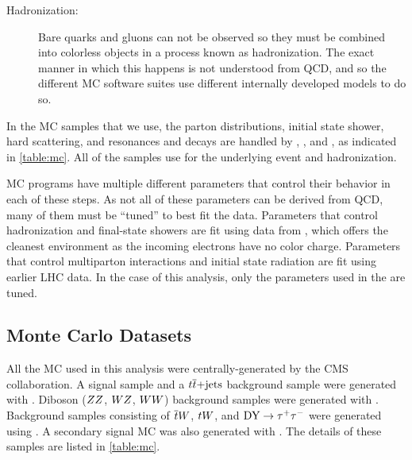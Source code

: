 \begin{description}
    \item[Hadronization:] Bare quarks and gluons can not be observed so they
        must be combined into colorless objects in a process known as
        hadronization. The exact manner in which this happens is not understood
        from QCD, and so the different MC software suites use different
        internally developed models to do so.


\end{description}

In the MC samples that we use, the parton distributions, initial state shower,
hard scattering, and resonances and decays are handled by \MADGRAPH
{} \cite{alwall2014}, \POWHEG
\cite{nason2004}\cite{alioli2010}\cite{re2011}, and \PYTHIAsix
{} \cite{sjostran2006}, as indicated in \cref{table:mc}.
All of the samples use \PYTHIAsix for the underlying event and hadronization.

MC programs have multiple different parameters that control their behavior in
each of these steps. As not all of these parameters can be derived from QCD,
many of them must be ``tuned'' to best fit the data. Parameters that control
hadronization and final-state showers are fit using data from \LEP, which
offers the cleanest environment as the incoming electrons have no color charge.
Parameters that control multiparton interactions and initial state radiation
are fit using earlier LHC data. In the case of this analysis, only the
parameters used in the \PYTHIAsix are tuned.

\subsection{Monte Carlo Datasets}
\label{ssec:monte_carlo}

All the MC used in this analysis were centrally-generated by the CMS
collaboration. A \DYtoll signal sample and a $t \overline{t}\text{+jets}$ background
sample were generated with \MADGRAPH. Diboson ($ZZ$, $WZ$, $WW$)
background samples were generated with \PYTHIAsix . Background samples
consisting of $\overline{t} W$, $t W$, and $\text{DY} \to \tau^{+} \tau^{-}$ were generated using
\POWHEG . A secondary signal MC was also generated with \POWHEG. The details of
these samples are listed in \cref{table:mc}.

